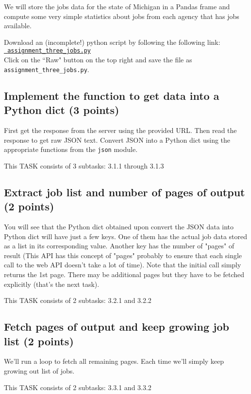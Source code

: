 \documentclass{article}
\begin{document}
We will store the jobs data for the state of Michigan in a Pandas frame and compute some very simple
statistics about jobs from each agency that has jobs available.

Download an (incomplete!) python script by following the following
link:\\
\href{https://github.com/ambujtewari/stats607a-fall2014/blob/master/homeworks/assignment_three_jobs.py}{\tt
assignment\_three\_jobs.py} \\
Click on the ``Raw" button on the top right and save the file as {\tt
assignment\_three\_jobs.py}.

\subsection{Implement the function to get data into a Python dict (3 points)}

First get the response from the server using the provided URL. Then
read the response to get raw JSON text. Convert JSON into a Python dict
using the appropriate functions from the {\tt json} module.

This TASK consists of 3 subtasks: 3.1.1 through 3.1.3

\subsection{Extract job list and number of pages of output (2 points)}

You will see that the Python dict obtained upon convert the JSON data
into Python dict will have just a few keys. One of them has the actual job data
stored as a list in its corresponding value. Another key has the number of "pages"
of result (This API has this concept of "pages" probably to ensure that
each single call to the web API doesn't take a lot of time). Note that the initial call simply returns the 1st page. There may be additional
pages but they have to be fetched explicitly (that's the next task).

This TASK consists of 2 subtasks: 3.2.1 and 3.2.2

\subsection{Fetch pages of output and keep growing job list (2 points)}

We'll run a loop to fetch all remaining pages. Each time we'll simply keep growing out list of jobs.

This TASK consists of 2 subtasks: 3.3.1 and 3.3.2
\end{document}
